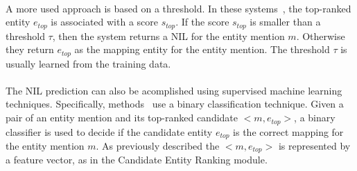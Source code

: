 \paragraph{}
A more used approach is based on a threshold. In these systems~\cite{todo}, the top-ranked entity $e_{top}$ is associated with a score $s_{top}$. If the score $s_{top}$ is smaller than a threshold $\tau$, then the system returns a NIL for the entity mention $m$. Otherwise they return $e_{top}$ as the mapping entity for the entity mention. The threshold $\tau$ is usually learned from the training data.
\paragraph{}
The NIL prediction can also be acomplished using supervised machine learning techniques. Specifically, methods~\cite{todo} use a binary classification technique. Given a pair of an entity mention and its top-ranked candidate $<\!\!m, e_{top}\!\!>$, a binary classifier is used to decide if the candidate entity $e_{top}$ is the correct mapping for the entity mention $m$. As previously described the $<\!\!m, e_{top}\!\!>$ is represented by a feature vector, as in the Candidate Entity Ranking module.


